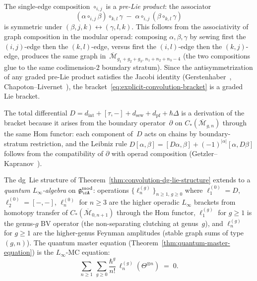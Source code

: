 \begin{remark}
\label{rem:convolution-pre-lie-jacobi}
The single-edge composition $\circ_{i,j}$ is a \emph{pre-Lie product}:
the associator
\[
(\alpha \circ_{i,j} \beta) \circ_{k,l} \gamma
\;-\;
\alpha \circ_{i,j} (\beta \circ_{k,l} \gamma)
\]
is symmetric under $(\beta, j, k) \leftrightarrow (\gamma, l, k)$.
This follows from the associativity of graph composition in the
modular operad: composing $\alpha, \beta, \gamma$ by sewing first
the $(i,j)$-edge then the $(k,l)$-edge, versus first the
$(i,l)$-edge then the $(k,j)$-edge, produces the same graph
in~$\overline{\mathcal{M}}_{g_1+g_2+g_3,\,n_1+n_2+n_3-4}$
(the two compositions glue to the same codimension-$2$ boundary
stratum).  Since the antisymmetrization of any graded pre-Lie
product satisfies the Jacobi identity
(Gerstenhaber~\cite{Ger63}, Chapoton--Livernet~\cite{CL01}),
the bracket~\eqref{eq:explicit-convolution-bracket}
is a graded Lie bracket.

The total differential $D = d_{\mathrm{int}} + [\tau,-] + d_{\mathrm{sew}}
+ d_{\mathrm{pf}} + \hbar\Delta$ is a derivation of the bracket
because it arises from the boundary operator~$\partial$ on
$C_*(\overline{\mathcal{M}}_{g,n})$ through the same Hom functor:
each component of~$D$ acts on chains by boundary-stratum
restriction, and the Leibniz rule $D[\alpha,\beta] =
[D\alpha,\beta] + (-1)^{|\alpha|}[\alpha,D\beta]$ follows from the
compatibility of $\partial$ with operad composition
(Getzler--Kapranov~\cite[\S5, Proposition~5.2]{GeK98}).
\end{remark}

\begin{theorem}
\label{thm:modular-quantum-linfty}
The dg~Lie structure of
Theorem~\textup{\ref{thm:convolution-dg-lie-structure}} extends to a
\emph{quantum $L_\infty$-algebra} on
$\mathfrak{g}_\cA^{\mathrm{mod}}$: operations
$\{\ell_n^{(g)}\}_{n \geq 1,\, g \geq 0}$ where
$\ell_1^{(0)} = D$, $\ell_2^{(0)} = [-,-]$,
$\ell_n^{(0)}$ for $n \geq 3$ are the higher operadic $L_\infty$
brackets from homotopy transfer of
$C_*(\overline{\mathcal{M}}_{0,n+1})$
through the Hom functor,
$\ell_1^{(g)}$ for $g \geq 1$ is the genus-$g$ BV operator
\textup{(}the non-separating clutching at genus~$g$\textup{)}, and
$\ell_n^{(g)}$ for $g \geq 1$ are the higher-genus Feynman amplitudes
\textup{(}stable graph sums of type $(g,n)$\textup{)}.  The quantum
master equation
\textup{(}Theorem~\textup{\ref{thm:quantum-master-equation})} is
the $L_\infty$-MC equation:
\begin{equation}\label{eq:quantum-linfty-mc}
\sum_{n \geq 1}\, \sum_{g \geq 0}
\frac{\hbar^g}{n!}\,
\ell_n^{(g)}(\Theta^{\otimes n})
\;=\; 0.
\end{equation}
\end{theorem}

